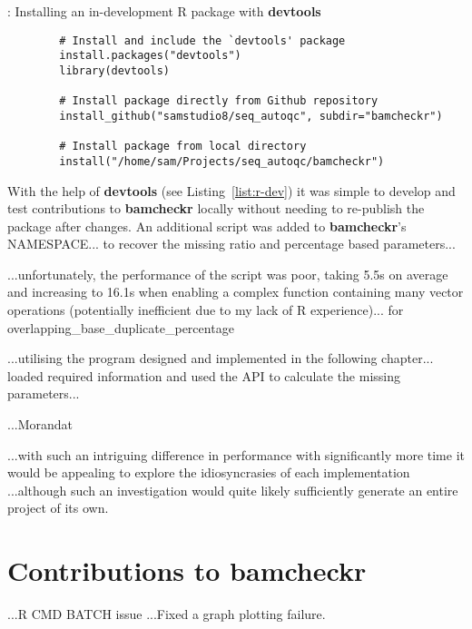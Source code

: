 \begin{listing}[H]
    \caption[r-dev]{: Installing an in-development R package with \textbf{devtools}}
    \label{list:r-dev}
    \begin{verbatim}
        # Install and include the `devtools' package
        install.packages("devtools")
        library(devtools)

        # Install package directly from Github repository
        install_github("samstudio8/seq_autoqc", subdir="bamcheckr")

        # Install package from local directory
        install("/home/sam/Projects/seq_autoqc/bamcheckr")

    \end{verbatim}
\end{listing}

With the help of \textbf{devtools}\citep{man:devtools} (see
Listing~\ref{list:r-dev}) it was simple to develop and test contributions to
\textbf{bamcheckr} locally without needing to re-publish the package after
changes. An additional script was added to \textbf{bamcheckr}'s NAMESPACE... to
recover the missing ratio and percentage based parameters...

...unfortunately, the performance of the script was poor, taking 5.5s on average
and increasing to 16.1s when enabling a complex function containing many vector
operations (potentially inefficient due to my lack of R experience)...
for overlapping\_base\_duplicate\_percentage

...utilising the program designed and implemented in the following chapter...
loaded required information and used the API to calculate the missing
parameters...

...Morandat\citep{morandat-rperf}

...with such an intriguing difference in performance with significantly more
time it would be appealing to explore the idiosyncrasies of each implementation
...although such an investigation would quite likely sufficiently generate an
entire project of its own.



\section{Contributions to bamcheckr}
...R CMD BATCH issue
...Fixed a graph plotting failure.

